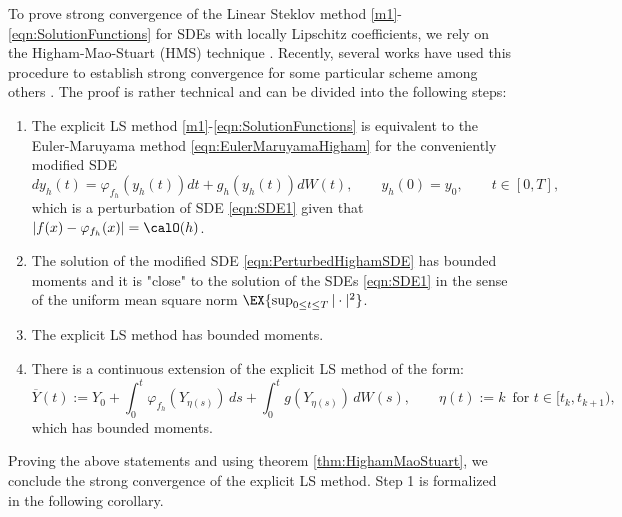 
 To prove strong convergence of the Linear Steklov method \eqref{m1}-\eqref{eqn:SolutionFunctions} for  
SDEs with locally Lipschitz coefficients, we rely on the Higham-Mao-Stuart (HMS) technique  
 \cite{Higham2002b}. Recently, several works have used  this  procedure  
 to establish strong convergence for some particular scheme among others \cite{Beyn2010,Guo2014,Hutzenthaler2015,Hutzenthaler2012a,Hutzenthaler2010,Lamba2007,
 Mao2013,Tretyakov2013}. The proof is rather technical and can be divided into the following steps:
 
 \begin{enumerate}[\bf{Step} 1:]
 	\item The explicit LS method \eqref{m1}-\eqref{eqn:SolutionFunctions} is equivalent to 
 	the Euler-Maruyama method \eqref{eqn:EulerMaruyamaHigham} 
	for the conveniently modified SDE
	\begin{equation} \label{eqn:PerturbedHighamSDE}
		dy_h(t)= \varphi_{f_h}(y_h(t))dt +g_h(y_h(t))dW(t),
		\qquad y_h(0)=y_0,  \qquad t\in [0,T],
	\end{equation}
	which is a perturbation of SDE \eqref{eqn:SDE1} given that $|f(x)-\varphi_{f_h}(x)|=\calO(h)$.
	\item\label{stp:PerturbedSolution}
			The solution of the modified SDE \eqref{eqn:PerturbedHighamSDE} has 
			bounded moments and it is 
			"close" to  the solution of the SDEs \eqref{eqn:SDE1}  in the sense of the uniform mean square norm 
			$
				\EX{\sup_{0\leq t\leq T}|\cdot|^2}
			$.
	\item
	\label{stp:MethodBoundedMoments}
		The explicit LS method  has bounded moments.
	\item
		There is a continuous extension of the explicit LS method of the form:
		$$\overline{Y}(t):=Y_0+\int_0^t\varphi_{f_h}(Y_{\eta(s)})\,ds+\int_0^t g(Y_{\eta(s)})\,dW(s), \qquad  
		\eta(t):=k \,\mbox{ for } t\in[t_k,t_{k+1}),$$
		 which has bounded moments.
	\end{enumerate}	
	Proving the above statements and using theorem \ref{thm:HighamMaoStuart},
	we  conclude the strong convergence of the explicit LS method. 
	Step 1 is formalized in the following corollary.
	

